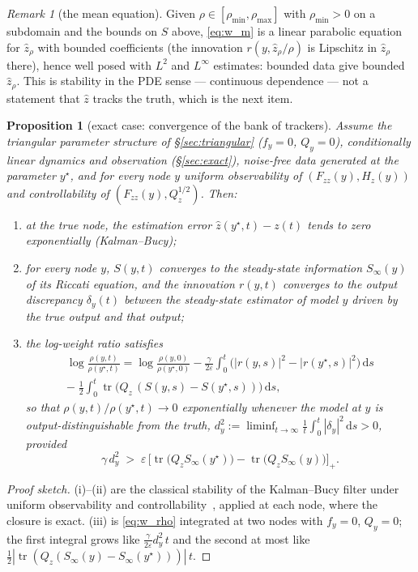 \documentclass[11pt,a4paper]{article}
\newcommand{\dd}{\,\mathrm{d}}
\newcommand{\tr}{\operatorname{tr}}
\newcommand{\zh}{\hat{z}}
\newcommand{\zr}{\hat{z}_{\rho}}   %
\newcommand{\eps}{\varepsilon}
\newcommand{\abs}[1]{\left\lvert #1 \right\rvert}
\theoremstyle{plain}
\newtheorem{proposition}{Proposition}
\theoremstyle{definition}
\theoremstyle{remark}
\newtheorem{remark}{Remark}
\begin{document}
\begin{remark}[the mean equation]
Given $\rho\in[\rho_{\min},\rho_{\max}]$ with $\rho_{\min}>0$ on a subdomain and the bounds on $S$ above, \eqref{eq:w_m} is a linear parabolic equation for $\zr$ with bounded coefficients (the innovation $r(y,\zr/\rho)$ is Lipschitz in $\zr$ there), hence well posed with $L^2$ and $L^\infty$ estimates: bounded data give bounded $\zr$. This is stability in the PDE sense --- continuous dependence --- not a statement that $\zh$ tracks the truth, which is the next item.
\end{remark}

\begin{proposition}[exact case: convergence of the bank of trackers]
Assume the triangular parameter structure of \S\ref{sec:triangular} ($f_y=0$, $Q_y=0$), conditionally linear dynamics and observation (\S\ref{sec:exact}), noise-free data generated at the parameter $y^\star$, and for every node $y$ uniform observability of $(F_{zz}(y),H_z(y))$ and controllability of $(F_{zz}(y),Q_z^{1/2})$. Then:
\begin{enumerate}[nosep,label=(\roman*)]
  \item at the true node, the estimation error $\zh(y^\star,t)-z(t)$ tends to zero exponentially (Kalman--Bucy);
  \item for every node $y$, $S(y,t)$ converges to the steady-state information $S_\infty(y)$ of its Riccati equation, and the innovation $r(y,t)$ converges to the output discrepancy $\delta_y(t)$ between the steady-state estimator of model $y$ driven by the true output and that output;
  \item the log-weight ratio satisfies
  \begin{multline*}
    \log\frac{\rho(y,t)}{\rho(y^\star,t)} = \log\frac{\rho(y,0)}{\rho(y^\star,0)}
    -\frac{\gamma}{2\eps}\int_0^t\big(\abs{r(y,s)}^2 - \abs{r(y^\star,s)}^2\big)\dd s \\
    -\; \frac12\int_0^t\tr\big(Q_z\,(S(y,s)-S(y^\star,s))\big)\dd s ,
  \end{multline*}
  so that $\rho(y,t)/\rho(y^\star,t)\to0$ exponentially whenever the model at $y$ is \emph{output-distinguishable} from the truth, $d_y^2 := \liminf_{t\to\infty}\frac1t\int_0^t\abs{\delta_y}^2\dd s > 0$, provided
  \[
    \gamma\, d_y^2 \;>\; \eps\,\Big[\tr\big(Q_zS_\infty(y^\star)\big) - \tr\big(Q_zS_\infty(y)\big)\Big]_+ .
  \]
\end{enumerate}
\end{proposition}
\begin{proof}[Proof sketch]
(i)--(ii) are the classical stability of the Kalman--Bucy filter under uniform observability and controllability~\cite{KalmanBucy1961,AndersonMoore1979}, applied at each node, where the closure is exact. (iii) is \eqref{eq:w_rho} integrated at two nodes with $f_y=0$, $Q_y=0$; the first integral grows like $\tfrac{\gamma}{2\eps}d_y^2\,t$ and the second at most like $\tfrac12\abs{\tr(Q_z(S_\infty(y)-S_\infty(y^\star)))}\,t$.
\end{proof}
\end{document}
